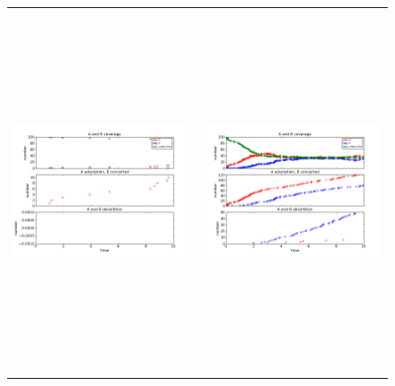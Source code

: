 \documentclass[11pt]{article}
\begin{document}
\setlength{\unitlength}{1in}
\begin{figure}[h!]
\begin{tabular}{cc}
\includegraphics[width=3.5in, height=4.2in]{./coadsorb_irreversible/AtoBirreversible10x10_101_Ades2x_EAx10E3_EB5E3_3.png} &
\includegraphics[width=3.5in, height=4.2in]{./coadsorb_irreversible/AtoBirreversible10x10_201_Ades2x_EAx10E3_EB5E3_3.png} \\

\end{tabular}
\end{figure}
\end{document}

